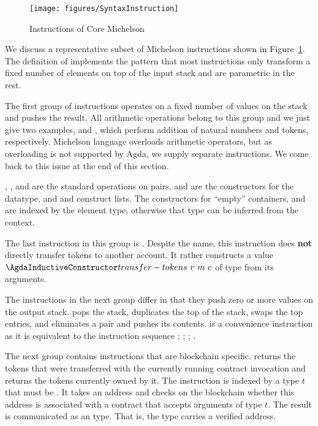 \begin{figure}[t]
  \texttt{[image: figures/SyntaxInstruction]}
  \caption{Instructions of Core Michelson}
  \label{fig:core-michelson-instructions}
\end{figure}
We discuss a representative subset of Michelson instructions shown in Figure~\ref{fig:core-michelson-instructions}.
The definition of {\AInstructionPlus} implements the pattern that most
instructions only transform a fixed number of elements on top of the input stack and are parametric in the rest. 

The first group of instructions operates on a fixed number of values on
the stack and pushes the result. All arithmetic operations belong to
this group and we just give two examples, {\AADDnn}  and {\AADDm},
which perform addition of natural numbers and tokens, respectively.
Michelson language overloads arithmetic operators, but as
overloading is not supported by Agda, we supply separate
instructions. We come back to this issue at the end of this section. 

, , and  are the standard operations on
pairs.  and  are the constructors for the
 datatype, and  and  construct
lists. The constructors for ``empty'' containers,  and
 are indexed by the element type, otherwise that type can be
inferred from the context.

The last instruction in this group is . Despite
the name, this instruction does \textbf{not} directly transfer tokens
to another account. It rather constructs a value
{$\AtransferTokens~v~m~c$} of type {\Aoperation} from its arguments.

The instructions in the next group differ in that they push zero or more
values on the output stack.  pops the stack,  duplicates the top of the
stack,  swaps the top entries, and  eliminates
a pair and pushes its contents.  is a convenience
instruction as it is equivalent to the instruction sequence
; ; ; . 

The next group contains instructions that are blockchain
specific.  returns the tokens that were transferred with
the currently running contract invocation and   returns
the tokens currently owned by it. The  instruction is
indexed by a type $t$ that must be {\APassable}. It takes an address
and checks on the blockchain whether this address is associated with a
contract that accepts arguments of type $t$. The result is
communicated as an  type. That is, the {\Acontract} type
carries a verified address.

